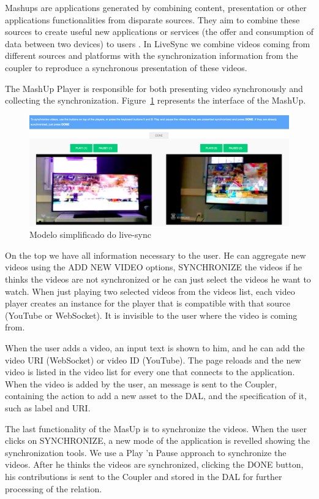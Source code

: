 Mashups are applications generated by combining content, presentation or other applications functionalities from disparate sources. They aim to combine these sources to create useful new applications or services (the offer and consumption of data between two devices) to users \cite{yu2008understanding}. In LiveSync we combine videos coming from different sources and platforms with the synchronization information from the coupler to reproduce a synchronous presentation of these videos.

The MashUp Player is responsible for both presenting video synchronously and collecting the synchronization. Figure~\ref{screen1} represents the interface of the MashUp.

\begin{figure}[h]
	\centerline{\includegraphics[scale=0.3] {figures/screen}}
	\caption{Modelo simplificado do live-sync}
	\label{screen1}
\end{figure}

On the top we have all information necessary to the user. He can aggregate new videos using the ADD NEW VIDEO options, SYNCHRONIZE the videos if he thinks the videos are not synchronized or he can just select the videos he want to watch. When just playing two selected videos from the videos list, each video player creates an instance for the player that is compatible with that source (YouTube or WebSocket). It is invisible to the user where the video is coming from.

When the user adds a video, an input text is shown to him, and he can add the video URI (WebSocket) or video ID (YouTube). The page reloads and the new video is listed in the video list for every one that connects to the application. When the video is added by the user, an message is sent to the Coupler, containing the action to add a new asset to the DAL, and the specification of it, such as label and URI.

The last functionality of the MasUp is to synchronize the videos. When the user clicks on SYNCHRONIZE, a new mode of the application is revelled showing the synchronization tools. We use a Play 'n Pause approach to synchronize the videos. After he thinks the videos are synchronized, clicking the DONE button, his contributions is sent to the Coupler and stored in the DAL for further processing of the relation.

